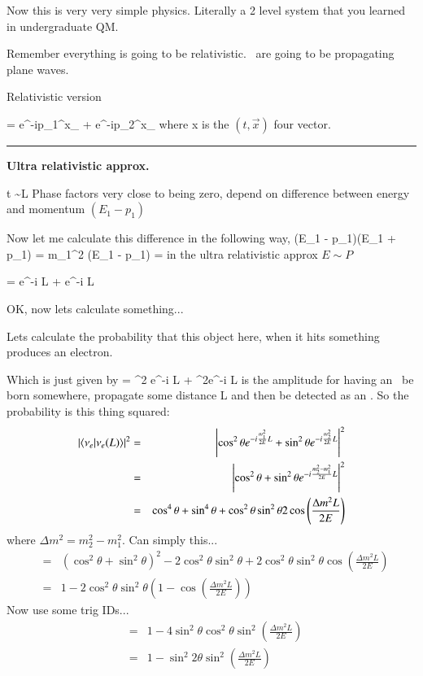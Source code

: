 {Now this is very very simple physics. 
Literally a 2 level system that you learned in undergraduate QM.


Remember everything is going to be relativistic. 
\nus\ are going to be propagating plane waves. 

Relativistic version 

\be
{} = \cos\theta e^{-ip_1^\mu x_\mu} \ket{\nuone} + \sin\theta e^{-ip_2^\mu x_\mu}\ket{\nutwo}
\ee
where x is the $(t,\vec{x})$ four vector. 

\noindent\rule{\textwidth}{1pt}

\textbf{Ultra relativistic approx. }

\be
t \sim L 
\ee
Phase factors very close to being zero, depend on difference between energy and momentum $(E_1 - p_1)$


Now let me calculate this difference in the following way,
\be
(E_1 - p_1)(E_1 + p_1) = m_1^2  \Rightarrow  (E_1 - p_1) =  
\ee
in the ultra relativistic approx $E \sim P$


\be
{} = \cos\theta e^{-i  L} \ket{\nuone} + \sin\theta e^{-i  L} \ket{\nutwo}
\ee

OK, now lets calculate something...


Lets calculate the probability that this object here, when it hits something produces an electron. 

Which is just given by 
\be
{} = \cos^2 \theta e^{-i  L} + \sin^2\theta e^{-i  L} 
\ee
is the amplitude for having an \nue\ be born somewhere, propagate some distance L and then be detected as an \nue.
So the probability is this thing squared:
\begin{eqnarray*}
\left|\braket{\nu_e | \nu_e(L) }\right|^2 &=& \left|\cos^2 \theta e^{-i \frac{m_1^2}{2E} L} + \sin^2\theta e^{-i \frac{m_2^2}{2E} L} \right|^2\\
       &=& \left|\cos^2 \theta+ \sin^2\theta e^{-i \frac{m_2^2 - m_1^2}{2E} L} \right|^2\\
       &=& \cos^4 \theta+ \sin^4\theta  + \cos^2\theta \sin^2 \theta 2 \cos \left( \frac{\Delta m^2 L}{2E} \right)
\end{eqnarray*}
where $\Delta m^2 = m_2^2 - m_1^2$.
Can simply this...
\begin{eqnarray*}
 &=& \left( \cos^2 \theta + \sin^2 \theta \right)^2  - 2 \cos^2 \theta \sin^2 \theta  + 2 \cos^2 \theta \sin^2 \theta \cos \left( \frac{\Delta m^2 L}{2E} \right) \\
 &=& 1 - 2 \cos^2 \theta \sin^2 \theta \left( 1  - \cos \left( \frac{\Delta m^2 L}{2E} \right) \right)
\end{eqnarray*}
Now use some  trig IDs...
\begin{eqnarray*}
 &=& 1 - 4 \sin^2 \theta \cos^2 \theta \sin^2 \left( \frac{\Delta m^2 L}{2E} \right)\\
 &=& 1 -  \sin^2 2\theta \sin^2 \left( \frac{\Delta m^2 L}{2E} \right)
\end{eqnarray*}

}
